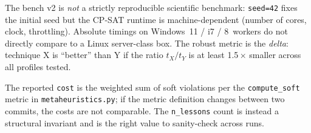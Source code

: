 \begin{avvertenzabox}
The bench v2 is \emph{not} a strictly reproducible scientific
benchmark: \texttt{seed=42} fixes the initial seed but the
CP-SAT runtime is machine-dependent (number of cores, clock,
throttling). Absolute timings on Windows~11 / i7 / 8~workers
do not directly compare to a Linux server-class box. The robust
metric is the \emph{delta}: technique X is ``better'' than Y if
the ratio $t_X / t_Y$ is at least 1.5\,$\times$ smaller across
all profiles tested.

The reported \texttt{cost} is the weighted sum of soft
violations per the \texttt{compute\_soft} metric in
\texttt{metaheuristics.py}; if the metric definition changes
between two commits, the costs are not comparable. The
\texttt{n\_lessons} count is instead a structural invariant
and is the right value to sanity-check across runs.
\end{avvertenzabox}
